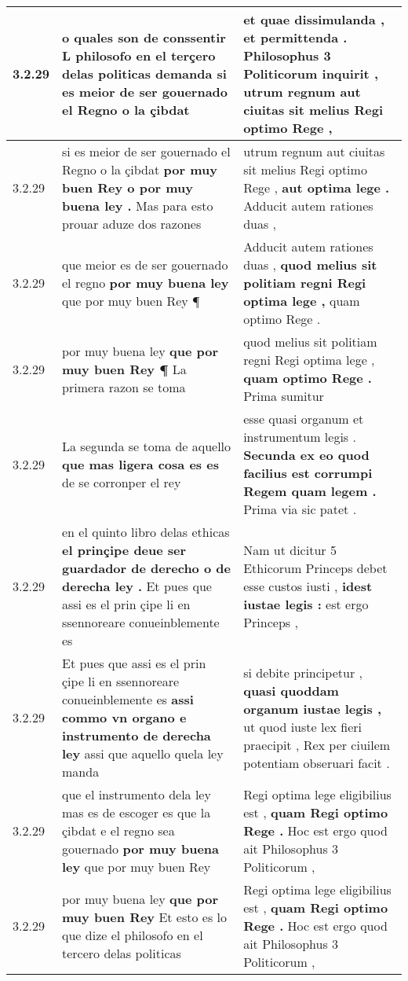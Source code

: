 \begin{tabular}{|p{1cm}|p{6.5cm}|p{6.5cm}|}
3.2.29 & o quales son de conssentir \textbf{ L philosofo en el terçero delas politicas demanda } si es meior de ser gouernado el Regno o la çibdat & et quae dissimulanda , et permittenda . \textbf{ Philosophus 3 Politicorum inquirit , } utrum regnum aut ciuitas sit melius Regi optimo Rege , \\\hline
3.2.29 & si es meior de ser gouernado el Regno o la çibdat \textbf{ por muy buen Rey o por muy buena ley . } Mas para esto prouar aduze dos razones & utrum regnum aut ciuitas sit melius Regi optimo Rege , \textbf{ aut optima lege . } Adducit autem rationes duas , \\\hline
3.2.29 & que meior es de ser gouernado el regno \textbf{ por muy buena ley } que por muy buen Rey ¶ & Adducit autem rationes duas , \textbf{ quod melius sit politiam regni Regi optima lege , } quam optimo Rege . \\\hline
3.2.29 & por muy buena ley \textbf{ que por muy buen Rey ¶ } La primera razon se toma & quod melius sit politiam regni Regi optima lege , \textbf{ quam optimo Rege . } Prima sumitur \\\hline
3.2.29 & La segunda se toma de aquello \textbf{ que mas ligera cosa es es } de se corronper el rey & esse quasi organum et instrumentum legis . \textbf{ Secunda ex eo quod facilius est corrumpi Regem quam legem . } Prima via sic patet . \\\hline
3.2.29 & en el quinto libro delas ethicas \textbf{ el prinçipe deue ser guardador de derecho o de derecha ley . } Et pues que assi es el prin çipe li en ssennoreare conueinblemente es & Nam ut dicitur 5 Ethicorum Princeps debet esse custos iusti , \textbf{ idest iustae legis : } est ergo Princeps , \\\hline
3.2.29 & Et pues que assi es el prin çipe li en ssennoreare conueinblemente es \textbf{ assi commo vn organo e instrumento de derecha ley } assi que aquello quela ley manda & si debite principetur , \textbf{ quasi quoddam organum iustae legis , } ut quod iuste lex fieri praecipit , Rex per ciuilem potentiam obseruari facit . \\\hline
3.2.29 & que el instrumento dela ley mas es de escoger es que la çibdat e el regno sea gouernado \textbf{ por muy buena ley } que por muy buen Rey & Regi optima lege eligibilius est , \textbf{ quam Regi optimo Rege . } Hoc est ergo quod ait Philosophus 3 Politicorum , \\\hline
3.2.29 & por muy buena ley \textbf{ que por muy buen Rey } Et esto es lo que dize el philosofo en el tercero delas politicas & Regi optima lege eligibilius est , \textbf{ quam Regi optimo Rege . } Hoc est ergo quod ait Philosophus 3 Politicorum , \\\hline

\end{tabular}
